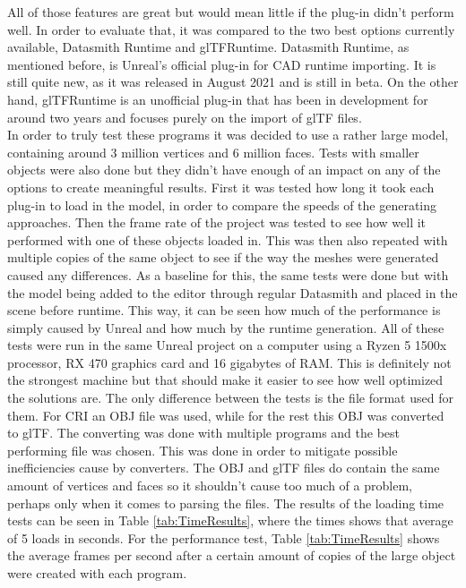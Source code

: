 All of those features are great but would mean little if the plug-in didn't perform well. In order to evaluate that, it was compared to the two best options currently available, Datasmith Runtime and glTFRuntime. Datasmith Runtime, as mentioned before, is Unreal's official plug-in for CAD runtime importing. It is still quite new, as it was released in August 2021 and is still in beta. On the other hand, glTFRuntime is an unofficial plug-in that has been in development for around two years and focuses purely on the import of glTF files.\\
In order to truly test these programs it was decided to use a rather large model, containing around 3 million vertices and 6 million faces. Tests with smaller objects were also done but they didn't have enough of an impact on any of the options to create meaningful results. First it was tested how long it took each plug-in to load in the model, in order to compare the speeds of the generating approaches. Then the frame rate of the project was tested to see how well it performed with one of these objects loaded in. This was then also repeated with multiple copies of the same object to see if the way the meshes were generated caused any differences. As a baseline for this, the same tests were done but with the model being added to the editor through regular Datasmith and placed in the scene before runtime. This way, it can be seen how much of the performance is simply caused by Unreal and how much by the runtime generation. All of these tests were run in the same Unreal project on a computer using a Ryzen 5 1500x processor, RX 470 graphics card and 16 gigabytes of RAM. This is definitely not the strongest machine but that should make it easier to see how well optimized the solutions are. The only difference between the tests is the file format used for them. For CRI an OBJ file was used, while for the rest this OBJ was converted to glTF. The converting was done with multiple programs and the best performing file was chosen. This was done in order to mitigate possible inefficiencies cause by converters. The OBJ and glTF files do contain the same amount of vertices and faces so it shouldn't cause too much of a problem, perhaps only when it comes to parsing the files. The results of the loading time tests can be seen in Table \ref{tab:TimeResults}, where the times shows that average of 5 loads in seconds. For the performance test, Table \ref{tab:TimeResults} shows the average frames per second after a certain amount of copies of the large object were created with each program.\\


